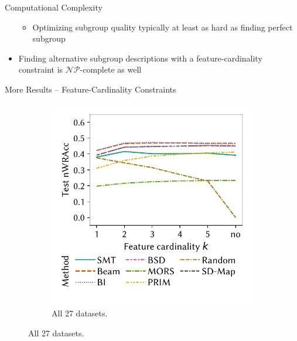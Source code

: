 \documentclass[en, navbaroff]{sdqbeamer}
\begin{document}
\begin{frame}[t]{Computational Complexity}
\begin{itemize}
\begin{itemize}
			\item Optimizing subgroup quality typically at least as hard as finding perfect subgroup
		\end{itemize}
		\vspace{\baselineskip}
		\item Finding alternative subgroup descriptions with a feature-cardinality constraint is $\mathcal{NP}$-complete as well
	\end{itemize}
\end{frame}

\begin{frame}[t]{More Results -- Feature-Cardinality Constraints}
	\begin{figure}
		\centering
		\begin{subfigure}[t]{0.35\textwidth}
			\centering
			\includegraphics[width=\textwidth, trim=10 25 10 10, clip]{plots/csd-cardinality-test-nwracc-all-datasets.pdf}
			\caption{All 27 datasets.}
			\label{fig:csd:cardinality-test-nwracc-all-datasets}

\end{subfigure}
\end{figure}
\end{frame}
\end{document}
